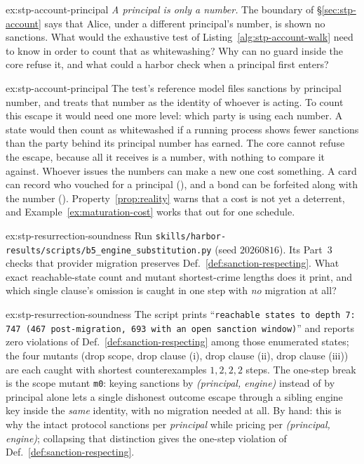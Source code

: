 \documentclass[11pt,a4paper]{article}
\theoremstyle{definition}
\newcounter{protocol}[section]
\begin{document}
\begin{pdexercise}[kind=Open,rating=3]{ex:stp-account-principal}
\emph{A principal is only a number.} The boundary of
\S\ref{sec:stp-account} says that Alice, under a different principal's
number, is shown no sanctions. What would the exhaustive test of
Listing~\ref{alg:stp-account-walk} need to know in order to count that
as whitewashing? Why can no guard inside the core refuse it, and what
could a harbor check when a principal first enters?
\end{pdexercise}
\begin{pdsolution}{ex:stp-account-principal}
The test's reference model files sanctions by principal number, and
treats that number as the identity of whoever is acting. To count this
escape it would need one more level: which party is using each number. A
state would then count as whitewashed if a running process shows fewer
sanctions than the party behind its principal number has earned. The
core cannot refuse the escape, because all it receives is a number, with
nothing to compare it against. Whoever issues the numbers can make a new
one cost something. A card can record who vouched for a principal
(), and a bond can be forfeited
along with the number ().
Property~\ref{prop:reality} warns that a cost is not yet a deterrent,
and Example~\ref{ex:maturation-cost} works that out for one schedule.
\end{pdsolution}
\begin{pdexercise}[kind=Trace,rating=2]{ex:stp-resurrection-soundness}
Run \texttt{skills/harbor-results/scripts/b5\_engine\_substitution.py} (seed
$20260816$). Its Part~3 checks that provider migration preserves
Def.~\ref{def:sanction-respecting}. What exact
reachable-state count and mutant shortest-crime lengths does it print, and
which single clause's omission is caught in one step with \emph{no}
migration at all?
\end{pdexercise}
\begin{pdsolution}{ex:stp-resurrection-soundness}
The script prints ``\texttt{reachable states to depth 7: 747 (467
post-migration, 693 with an open sanction window)}'' and reports zero
violations of Def.~\ref{def:sanction-respecting} among those enumerated
states;
the four mutants (drop scope, drop clause (i), drop clause (ii), drop clause
(iii)) are each caught with shortest counterexamples $1, 2, 2, 2$ steps. The
one-step break is the scope mutant \texttt{m0}: keying sanctions by
\emph{(principal, engine)} instead of by principal alone lets a single dishonest
outcome escape through a sibling engine key inside the \emph{same} identity,
with no migration needed at all. By hand: this is why the intact protocol
sanctions per \emph{principal} while pricing per \emph{(principal, engine)};
collapsing that distinction gives the one-step violation of
Def.~\ref{def:sanction-respecting}.
\end{pdsolution}
\end{document}

